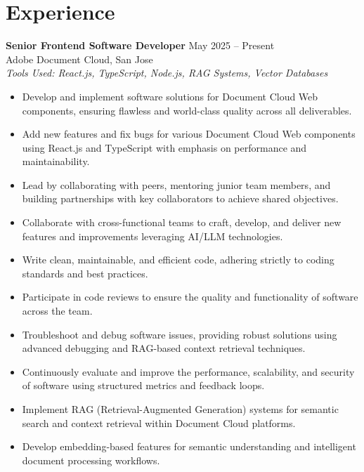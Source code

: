 \documentclass[a4paper,10pt]{article}
\begin{document}
    \section*{Experience}

    \textbf{Senior Frontend Software Developer} \hfill May 2025 -- Present\\
    Adobe Document Cloud, San Jose\\
    \textit{Tools Used: React.js, TypeScript, Node.js, RAG Systems, Vector Databases}

    
\begin{itemize}[leftmargin=*]
    \item Develop and implement software solutions for Document Cloud Web components, ensuring flawless and world-class quality across all deliverables.
    
    \item Add new features and fix bugs for various Document Cloud Web components using React.js and TypeScript with emphasis on performance and maintainability.
    
    \item Lead by collaborating with peers, mentoring junior team members, and building partnerships with key collaborators to achieve shared objectives.
    
    \item Collaborate with cross-functional teams to craft, develop, and deliver new features and improvements leveraging AI/LLM technologies.
    
    \item Write clean, maintainable, and efficient code, adhering strictly to coding standards and best practices.
    
    \item Participate in code reviews to ensure the quality and functionality of software across the team.
    
    \item Troubleshoot and debug software issues, providing robust solutions using advanced debugging and RAG-based context retrieval techniques.
    
    \item Continuously evaluate and improve the performance, scalability, and security of software using structured metrics and feedback loops.
    
    \item Implement RAG (Retrieval-Augmented Generation) systems for semantic search and context retrieval within Document Cloud platforms.
    
    \item Develop embedding-based features for semantic understanding and intelligent document processing workflows.
\end{itemize}
\end{document}
